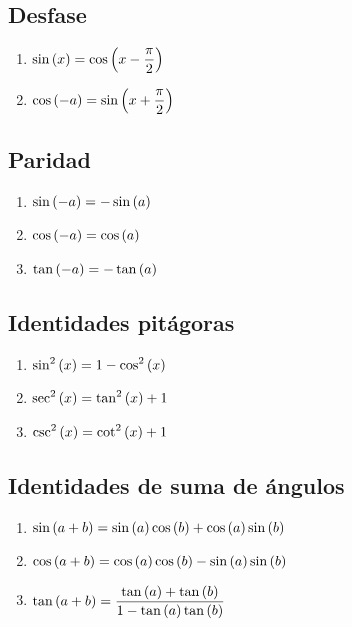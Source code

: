 \documentclass[../../main.tex]{subfiles}
\begin{document}
    \subsection{Desfase}
        \begin{enumerate}
        	\item $\displaystyle \sin\left( x \right) = \cos\left( x - \frac \pi 2 \right)$
        	\item $\displaystyle \cos\left( -a \right) = \sin\left( x + \frac \pi 2 \right)$
        \end{enumerate}
        
    \subsection{Paridad}
        \begin{enumerate}
        	\item $\displaystyle \sin\left( -a \right) = -\sin\left( a \right)$
        	\item $\displaystyle \cos\left( -a \right) = \cos\left( a \right)$
        	\item $\displaystyle \tan\left( -a \right) = - \tan\left( a \right)$
        \end{enumerate}


	\subsection{Identidades pitágoras}
        \begin{enumerate}
        	\item $\displaystyle \sin^2\left( x \right) = 1 - \cos^2\left( x \right)$
        	\item $\displaystyle \sec^2\left( x \right) = \tan^2\left( x \right) + 1$
        	\item $\displaystyle \csc^2\left( x \right) = \cot^2\left( x \right) + 1$
        \end{enumerate}
        
    \subsection{Identidades de suma de ángulos}
        \begin{enumerate}
        	\item $\displaystyle \sin\left( a+b \right) = \sin\left( a \right) \cos\left( b \right) + \cos\left( a \right) \sin\left( b \right)$
        	\item $\displaystyle \cos\left( a+b \right) = \cos\left( a \right) \cos\left( b \right) - \sin\left( a \right) \sin\left( b \right)$
        	\item $\displaystyle \tan\left( a+b \right) = \frac{\tan\left( a \right) + \tan\left( b \right)}{1 - \tan\left( a \right) \tan\left( b \right)}$
        \end{enumerate}
        
\end{document}
